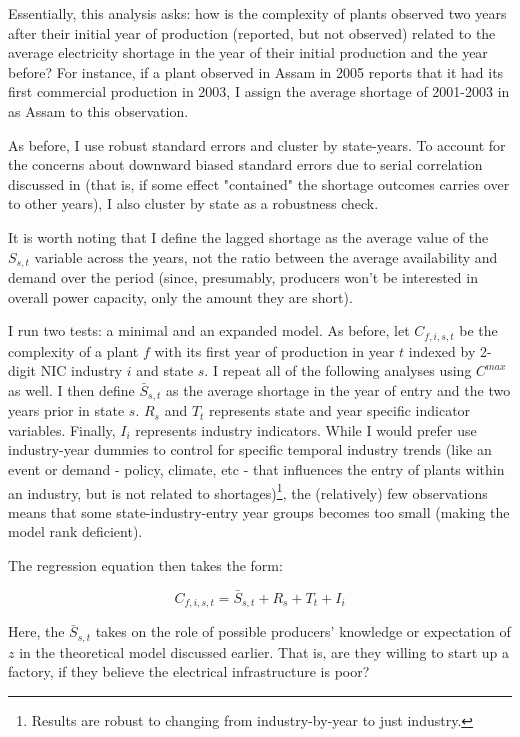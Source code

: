 \documentclass[11pt]{article}
\begin{document}
Essentially, this analysis asks: how is the complexity of plants observed two years after their initial year of production (reported, but not observed) related to the average electricity shortage in the year of their initial production and the year before? For instance, if a plant observed in Assam in 2005 reports that it had its first commercial production in 2003, I assign the average shortage of 2001-2003 in as Assam to this observation.

As before, I use robust standard errors and cluster by state-years. To account for the concerns about downward biased standard errors due to serial correlation discussed in \cite{bertrand_how_2004} (that is, if some effect "contained" the shortage outcomes carries over to other years), I also cluster by state as a robustness check.

It is worth noting that I define the lagged shortage as the average value of the $S_{s,t}$ variable across the years, not the ratio between the average availability and demand over the period (since, presumably, producers won't be interested in overall power capacity, only the amount they are short).

I run two tests: a minimal and an expanded model. As before, let $C_{f,i,s,t}$ be the complexity of a plant $f$ with its first year of production in year $t$ indexed by 2-digit NIC industry $i$ and state $s$. I repeat all of the following analyses using $C^{max}$ as well. I then define $\bar{S}_{s,t}$ as the average shortage in the year of entry and the two years prior in state $s$. $R_{s}$ and $T_{t}$ represents state and year specific indicator variables. Finally, $I_{i}$ represents industry indicators. While I would prefer use industry-year dummies to control for specific temporal industry trends (like an event or demand - policy, climate, etc - that influences the entry of plants within an industry, but is not related to shortages)\footnote{Results are robust to changing from industry-by-year to just industry.}, the (relatively) few observations means that some state-industry-entry year groups becomes too small (making the model rank deficient).


The regression equation then takes the form:

\begin{equation}
\label{eqn:interact}
	C_{f,i,s,t} = \bar{S}_{s,t} + R_{s} + T_{t} + I_{i} 
\end{equation}

Here, the $\bar{S}_{s,t}$ takes on the role of possible producers' knowledge or expectation of $z$ in the theoretical model discussed earlier. That is, are they willing to start up a factory, if they believe the electrical infrastructure is poor?
 
\end{document}
